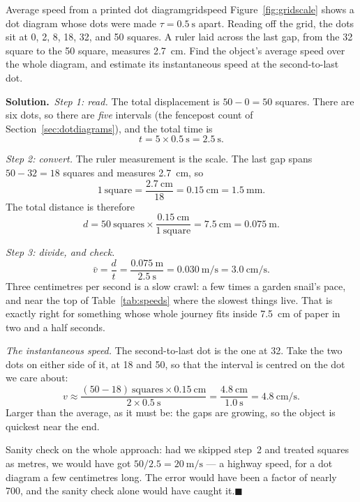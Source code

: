 \documentclass[11pt,twoside,openany]{book}
\newcounter{check}[chapter]
\newcommand{\solution}{\par\smallskip\noindent\textbf{Solution.}\ }
\newcommand{\qed}{\hfill$\blacksquare$}
\begin{document}
\begin{example}{Average speed from a printed dot diagram}{gridspeed}
Figure~\ref{fig:gridscale} shows a dot diagram whose dots were made $\tau = \SI{0.5}{\second}$ apart. Reading off the grid, the dots sit at \num{0}, \num{2}, \num{8}, \num{18}, \num{32}, and \num{50} squares. A ruler laid across the last gap, from the \num{32} square to the \num{50} square, measures \SI{2.7}{\centi\metre}. Find the object's average speed over the whole diagram, and estimate its instantaneous speed at the second-to-last dot.

\solution \emph{Step 1: read.} The total displacement is $50 - 0 = 50$ squares. There are six dots, so there are \emph{five} intervals (the fencepost count of Section~\ref{sec:dotdiagrams}), and the total time is
\[
t = 5 \times \SI{0.5}{\second} = \SI{2.5}{\second}.
\]

\emph{Step 2: convert.} The ruler measurement is the scale. The last gap spans $50 - 32 = 18$ squares and measures \SI{2.7}{\centi\metre}, so
\[
1\ \text{square} = \frac{\SI{2.7}{\centi\metre}}{18} = \SI{0.15}{\centi\metre} = \SI{1.5}{\milli\metre}.
\]
The total distance is therefore
\[
d = 50\ \text{squares} \times \frac{\SI{0.15}{\centi\metre}}{1\ \text{square}} = \SI{7.5}{\centi\metre} = \SI{0.075}{\metre}.
\]

\emph{Step 3: divide, and check.}
\[
\bar v = \frac{d}{t} = \frac{\SI{0.075}{\metre}}{\SI{2.5}{\second}} = \SI{0.030}{\metre\per\second} = \SI{3.0}{\centi\metre\per\second}.
\]
Three centimetres per second is a slow crawl: a few times a garden snail's pace, and near the top of Table~\ref{tab:speeds} where the slowest things live. That is exactly right for something whose whole journey fits inside \SI{7.5}{\centi\metre} of paper in two and a half seconds.

\emph{The instantaneous speed.} The second-to-last dot is the one at \num{32}. Take the two dots on either side of it, at \num{18} and \num{50}, so that the interval is centred on the dot we care about:
\[
v \approx \frac{(50 - 18)\ \text{squares} \times \SI{0.15}{\centi\metre}}{2 \times \SI{0.5}{\second}} = \frac{\SI{4.8}{\centi\metre}}{\SI{1.0}{\second}} = \SI{4.8}{\centi\metre\per\second}.
\]
Larger than the average, as it must be: the gaps are growing, so the object is quickest near the end.

Sanity check on the whole approach: had we skipped step~2 and treated squares as metres, we would have got $50/2.5 = \SI{20}{\metre\per\second}$ --- a highway speed, for a dot diagram a few centimetres long. The error would have been a factor of nearly \num{700}, and the sanity check alone would have caught it.\qed
\end{example}
\end{document}

